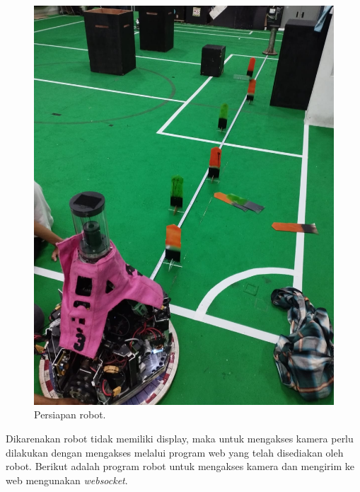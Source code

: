 \begin{figure}[H]
  \centering
  \includegraphics[scale=0.20]{gambar/ambil_data.jpeg}
  \caption{Persiapan robot.}
  \label{fig:persiapanrobot}
\end{figure}

Dikarenakan robot tidak memiliki display, maka untuk mengakses kamera perlu dilakukan dengan mengakses melalui program web yang telah disediakan oleh robot. Berikut adalah program robot untuk mengakses kamera dan mengirim ke web mengunakan \textit{websocket}.







